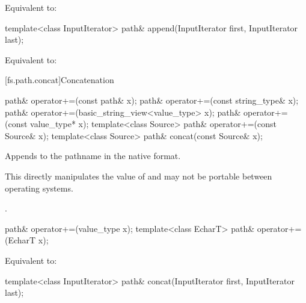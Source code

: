 \begin{itemdescr}
\pnum
\effects
Equivalent to: 
\end{itemdescr}

%
%
\begin{itemdecl}
template<class InputIterator>
  path& append(InputIterator first, InputIterator last);
\end{itemdecl}

\begin{itemdescr}
\pnum
\effects
Equivalent to: 
\end{itemdescr}

[fs.path.concat]{Concatenation}

%
%
\begin{itemdecl}
path& operator+=(const path& x);
path& operator+=(const string_type& x);
path& operator+=(basic_string_view<value_type> x);
path& operator+=(const value_type* x);
template<class Source>
  path& operator+=(const Source& x);
template<class Source>
  path& concat(const Source& x);
\end{itemdecl}

\begin{itemdescr}
\pnum
\effects
Appends  to the pathname in the native format.
\begin{note}
This directly manipulates the value of 
and may not be portable between operating systems.
\end{note}

\pnum
\returns
{}.
\end{itemdescr}

%
%
\begin{itemdecl}
path& operator+=(value_type x);
template<class EcharT>
  path& operator+=(EcharT x);
\end{itemdecl}

\begin{itemdescr}
\pnum
\effects
Equivalent to: 
\end{itemdescr}

%
\begin{itemdecl}
template<class InputIterator>
  path& concat(InputIterator first, InputIterator last);
\end{itemdecl}

